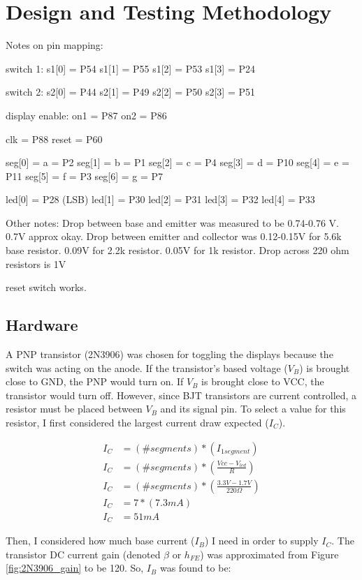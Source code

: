 \documentclass[11pt]{article}
\begin{document}
\section{Design and Testing Methodology}

Notes on pin mapping:

switch 1:
s1[0] = P54
s1[1] = P55
s1[2] = P53
s1[3] = P24

switch 2:
s2[0] = P44
s2[1] = P49
s2[2] = P50
s2[3] = P51

display enable:
on1 = P87
on2 = P86

clk = P88
reset = P60

seg[0] = a = P2
seg[1] = b = P1
seg[2] = c = P4
seg[3] = d = P10
seg[4] = e = P11
seg[5] = f = P3
seg[6] = g = P7

led[0] = P28		(LSB)
led[1] = P30
led[2] = P31
led[3] = P32
led[4] = P33



Other notes:
Drop between base and emitter was measured to be 0.74-0.76 V. 0.7V approx okay.
Drop between emitter and collector was 0.12-0.15V for 5.6k base resistor. 0.09V for 2.2k resistor. 0.05V for 1k resistor. 
Drop across 220 ohm resistors is 1V

reset switch works.


\subsection{Hardware}


A PNP transistor (2N3906) was chosen for toggling the displays because the switch was acting on the anode. If the transistor's based voltage ($V_B$) is brought close to GND, the PNP would turn on. If $V_B$ is brought close to VCC, the transistor would turn off. However, since BJT transistors are current controlled, a resistor must be placed between $V_B$ and its signal pin. To select a value for this resistor, I first considered the largest current draw expected ($I_C$).

\begin{align*}
I_{C} &= (\# segments)*(I_{1segment}) \\
I_{C} &= (\# segments)*(\frac{Vcc-V_{led}}{R}) \\
I_{C} &= (\# segments)*(\frac{3.3V-1.7V}{220\Omega}) \\
I_{C} &= 7*(7.3mA) \\
I_{C} &= 51mA
\end{align*}

Then, I considered how much base current ($I_{B}$) I need in order to supply $I_{C}$. The transistor DC current gain (denoted $\beta$ or $h_{FE}$) was approximated from Figure \ref{fig:2N3906_gain} to be 120. So, $I_{B}$ was found to be:
\end{document}
